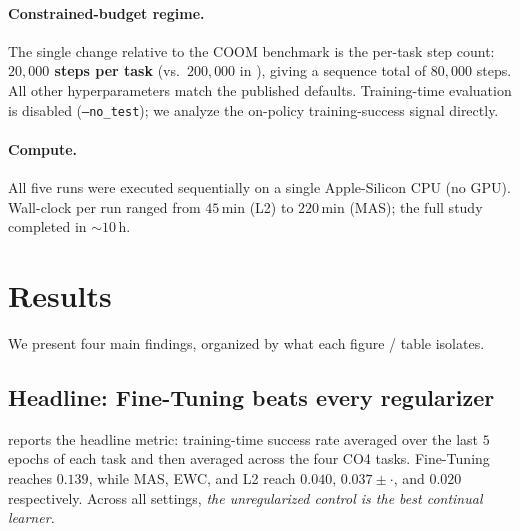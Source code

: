 \documentclass[11pt,a4paper]{article}
\begin{document}
\paragraph{Constrained-budget regime.} The single change relative to the
COOM benchmark is the per-task step count: \textbf{$20{,}000$ steps per
task} (vs.\ $200{,}000$ in \cite{tomilin2024coom}), giving a sequence
total of $80{,}000$ steps. All other hyperparameters match the published
defaults. Training-time evaluation is disabled (\texttt{--no\_test}); we
analyze the on-policy training-success signal directly.

\paragraph{Compute.} All five runs were executed sequentially on a single
Apple-Silicon CPU (no GPU). Wall-clock per run ranged from
$45$\,min (L2) to $220$\,min (MAS); the full study completed in
${\sim}10$\,h.

\section{Results}
\label{sec:results}

We present four main findings, organized by what each figure / table
isolates.

\subsection{Headline: Fine-Tuning beats every regularizer}

\begin{table}[t]
  \centering
  \caption{\textbf{Average Performance} (last-5-epoch mean training success
    per task, averaged across the four tasks). Lower-is-not-better is the
    point: every regularization-based method underperforms the unregularized
    Fine-Tuning baseline by $3$--$7\times$. EWC reports mean$\pm$std over
    $3$ seeds; FT/L2/MAS over $1$ seed each.}
  \label{tab:avg_perf}
  
\end{table}

 reports the headline metric: training-time success rate
averaged over the last $5$ epochs of each task and then averaged across the
four CO4 tasks. Fine-Tuning reaches $0.139$, while MAS, EWC, and L2 reach
$0.040$, $0.037 \pm \cdot$, and $0.020$ respectively. Across all settings,
\emph{the unregularized control is the best continual learner.}
\end{document}
